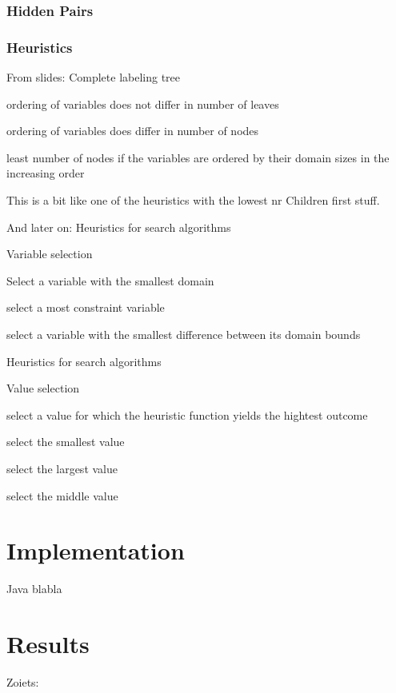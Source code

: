 \documentclass[11pt]{article} %
\begin{document}
\subsubsection{Hidden Pairs}

\subsubsection{Heuristics}

From slides:
Complete labeling tree

ordering of variables does not differ in
number of leaves

ordering of variables does differ in number
of nodes

least number of nodes if the variables are
ordered by their domain sizes in the
increasing order

This is a bit like one of the heuristics with the lowest nr Children first stuff.

And later on:
Heuristics for search algorithms

Variable selection

Select a variable with the smallest domain

select a most constraint variable


select a variable with the smallest difference between its domain bounds

Heuristics for search algorithms

Value selection

select a value for which the heuristic function yields the hightest outcome

select the smallest value

select the largest value

select the middle value


\section{Implementation}

Java blabla

\section{Results}

Zoiets:
\end{document}
